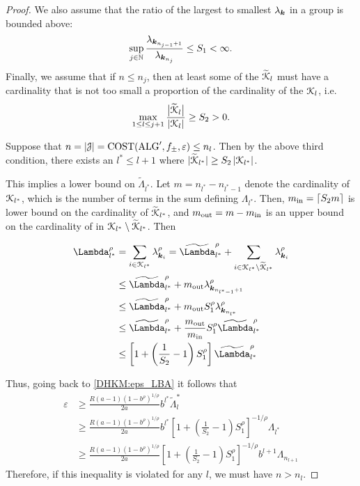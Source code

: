 \documentclass[USenglish]{article}
\theoremstyle{dgthm}
\theoremstyle{dgthm}
\theoremstyle{dgthm}
\theoremstyle{dgthm}
\theoremstyle{dgdef}
\theoremstyle{definition}
\DeclareMathOperator{\ALG}{ALG}
\DeclareMathOperator{\COST}{COST}
\newcommand{\tcalK}{\widetilde{\calK}}
\newcommand{\inc}{\textup{in}}
\newcommand{\out}{\textup{out}}
\def\abs#1{\ensuremath{\left \lvert #1 \right \rvert}}
\newcommand{\normabs}[1]{\ensuremath{\lvert #1 \rvert}}
\newcommand{\bigabs}[1]{\ensuremath{\bigl \lvert #1 \bigr \rvert}}
\newcommand{\tLambda}{\widetilde{\Lambda}}
\begin{document}
\begin{proof}
{We also assume that the ratio of the largest to smallest $\lambda_{{\boldsymbol{k}}}$ in a group is bounded above:
\begin{equation*}
    \sup_{j \in {\mathbb{N}}} \frac{\lambda_{{\boldsymbol{k}}_{n_{j-1}+1}}}{\lambda_{{\boldsymbol{k}}_{n_{j}}}} \leq S_1 < \infty.
\end{equation*}
Finally, we assume that if $n\le n_j$, then at least some of the $\tcalK_l$ must have a cardinality that is not too small a proportion of the cardinality of the  ${\mathcal{K}}_l$, i.e. 
\begin{equation*}
    \max_{1 \le l \le j+1} \frac{\bigabs{\tcalK_l}}{\abs{\calK_l}} \ge S_2 > 0.
\end{equation*}

Suppose that $n = \abs{\calJ} = \COST(\ALG',f_{\pm},\varepsilon) \le n_l$.  Then by the above third condition, there exists an $l^* \le l+1$ where $\normabs{\tcalK_{l^*}} \ge S_2 \abs{\calK_{l^*}}$.  

This implies a lower bound on $\tLambda_{l^*}$.  Let $m = n_{l^*} - n_{l^*-1}$ denote the cardinality of ${\mathcal{K}}_{l^*}$, which is the number of terms in the sum defining $\Lambda_{l^*}$.  Then, $m_{\inc} = \lceil S_2 m \rceil$ is lower bound on the cardinality of $\tcalK_{l^*}$, and $m_{\out} = m - m_{\inc}$ is an upper bound on the cardinality of in $\calK_{l^*} \setminus \tcalK_{l^*}$.  Then

\begin{align*}
    \Lambda_{l^*}^\rho & = \sum_{i \in \calK_{l^*}} \lambda_{\bsk_i}^{\rho} =  \tLambda_{l^*}^\rho + \sum_{i \in \calK_{l^*} \setminus \tcalK_{l^*}} \lambda_{\bsk_i}^{\rho}
    \\
    &\le  \tLambda_{l^*}^\rho + m_{\out} \lambda_{\bsk_{n_{l^* -1}+1}}^\rho \\
    &\le  \tLambda_{l^*}^\rho + m_{\out} S_1^\rho \lambda_{\bsk_{n_{l^*}}}^\rho \\
    & \le \tLambda_{l^*}^\rho + \frac{m_{\out}}{m_{\inc}} S_1^\rho \tLambda_{l^*}^\rho \\
    & \le \left[1 + \left(\frac 1 {S_2} -1 \right) S_1^\rho \right] \tLambda_{l^*}^\rho
\end{align*}

Thus, going back to \eqref{DHKM:eps_LBA} it follows that 
\begin{align}
\nonumber
\varepsilon 
& \ge \frac{R(a-1)(1 - b^\rho)^{1/\rho}}{2a} b^{l^*} \tLambda_l^* 
\\
\nonumber
& \ge  \frac{R(a-1)(1 - b^\rho)^{1/\rho}}{2a} b^{l^*} \left[1 + \left(\frac 1 {S_2} -1 \right) S_1^\rho \right]^{-1/\rho} \Lambda_{l^*}
\\
\nonumber
& \ge  \frac{R(a-1)(1 - b^\rho)^{1/\rho}}{2a}  \left[1 + \left(\frac 1 {S_2} -1 \right) S_1^\rho \right]^{-1/\rho} b^{l+1} \Lambda_{n_{l+1}}
\end{align}
Therefore, if this inequality is violated for any $l$, we must have $n>n_l$.}


\end{proof}
\end{document}
